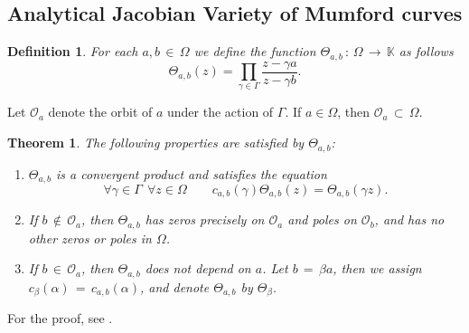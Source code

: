 \documentclass[]{amsart}
\numberwithin{equation}{section}
\newtheorem{theorem}{Theorem}[section]
\newtheorem{proposition}[theorem]{Proposition}
\newtheorem{definition}{Definition}[section]
\begin{document}
 
 

\subsection{Analytical Jacobian Variety of Mumford curves}
\begin{definition}\label{ThetaABDef}
For each $a,b \,{\in}\, \Omega$ we define the function 
$\Theta_{a,b}\,{:}\, \Omega \,{\to}\, \mathbb{K}$ as
follows
\begin{equation} 
\Theta_{a,b}(z)=\prod_{\gamma \in \Gamma}\frac{z-\gamma a}{z-\gamma b}.
\end{equation} 
\end{definition}
Let $\mathcal{O}_a$ denote the orbit of $a$ under the action of $\Gamma$.
If $a\in \Omega$, then $\mathcal{O}_a \,{\subset}\, \Omega$.
\begin{theorem}\label{T:ThetaAB}
The following properties are satisfied by $\Theta_{a,b}$:
\begin{enumerate}
\item $\Theta_{a,b}$ is a convergent product and satisfies the equation  
\begin{equation}\label{OmegaGamma}
\forall \gamma \in \Gamma\ \ \forall z \in \Omega
\qquad c_{a,b}(\gamma) \Theta_{a,b}(z)=\Theta_{a,b}(\gamma z).
\end{equation}
\item If $b \,{\not \in}\, \mathcal{O}_a$, 
then $\Theta_{a,b}$  has zeros precisely on $\mathcal{O}_a$ and poles on $\mathcal{O}_b$, 
and has no other zeros or poles in $\Omega$.
\item If $b \,{\in}\, \mathcal{O}_a$, then $\Theta_{a,b}$ does not depend on $a$. 
Let $b\,{=}\,\beta a$, then we assign  $c_{\beta}(\alpha) \,{=}\,c_{a,b}(\alpha)$, 
and denote $\Theta_{a,b}$ by $\Theta_{\beta}$.
\end{enumerate}
\end{theorem}
For the proof, 
see \cite[Chap.\,2]{GV}. 
\end{document}
